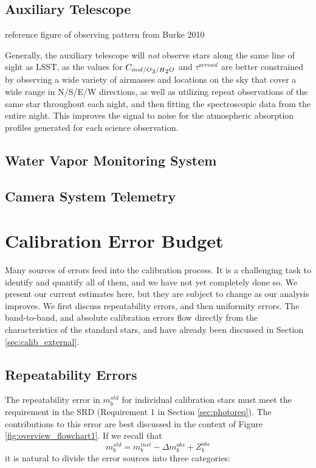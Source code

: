 \documentclass[12pt,preprint]{aastex}
\newcommand{\water}   {H\textsubscript{2}O}
\newcommand{\ozone}    {O\textsubscript{3}}
\begin{document}
\subsection{Auxiliary Telescope}

reference figure of observing pattern from Burke 2010



Generally, the auxiliary telescope will {\it not} observe stars along the
same line of sight as LSST, as the values for
$C_{mol/\ozone/\water}$ and $\tau^{aerosol}$ are better
constrained by observing a wide variety of airmasses and locations on
the sky that cover a wide range in N/S/E/W directions, as well as utilizing
repeat observations of the same star throughout each night, and then
fitting the spectroscopic data from the entire night. This improves the 
signal to noise for the atmospheric absorption profiles generated for each science observation.



\subsection{Water Vapor Monitoring System}

\subsection{Camera System Telemetry}













\section{Calibration Error Budget}
\label{sec:error_budget}
Many sources of errors feed into the calibration process.  It is a challenging task to identify and quantify all of them, and we have not yet completely done so.  We present our current estimates here, but they are subject to change as our analysis improves. We first
discuss repeatability errors, and then uniformity errors.   The band-to-band, and absolute calibration errors flow directly from the characteristics of the standard stars, and have already been discussed in Section \ref{sec:calib_external}.
\subsection{Repeatability Errors}
The repeatability error in $m_b^{std}$ for individual calibration stars must meet the requirement in the SRD (Requirement 1 in Section \ref{sec:photoreq}).  The contributions to this error are best discussed in the context of Figure \ref{fig:overview_flowchart1}.  If we recall that
\begin{equation}
m_b^{std} = m_b^{inst} - \Delta m_b^{obs} + Z_b^{obs}
\end{equation}
it is natural to divide the error sources into three categories:
\end{document}
